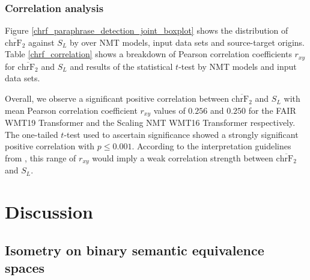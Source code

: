 \documentclass[11pt,a4paper]{article}
\begin{document}
\subsubsection{Correlation analysis}

Figure \ref{chrf_paraphrase_detection_joint_boxplot} shows the distribution of $\overline{\text{chrF}_2}$ against $S_L$ by over NMT models, input data sets and source-target origins. Table \ref{chrf_correlation} shows a breakdown of Pearson correlation coefficients $r_{xy}$ for $\overline{\text{chrF}_2}$ and $S_L$ and results of the statistical $t$-test by NMT models and input data sets.

Overall, we observe a significant positive correlation between $\overline{\text{chrF}_2}$ and $S_L$ with mean Pearson correlation coefficient $r_{xy}$ values of $0.256$ and $0.250$ for the FAIR WMT19 Transformer and the Scaling NMT WMT16 Transformer respectively. The one-tailed $t$-test used to ascertain significance showed a strongly significant positive correlation with $p\leq0.001$. According to the interpretation guidelines from \citet{schober2018correlation}, this range of $r_{xy}$ would imply a weak correlation strength between $\overline{\text{chrF}_2}$ and $S_L$. 

\section{Discussion}

\subsection{Isometry on binary semantic equivalence spaces}
\end{document}
